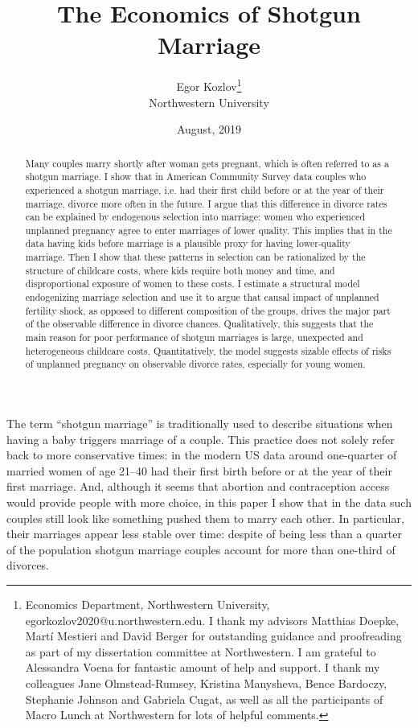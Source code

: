 \documentclass[12pt,letter]{article}
\title{The Economics of Shotgun Marriage}
\author{Egor Kozlov\thanks{Economics Department, Northwestern University, egorkozlov2020@u.northwestern.edu. I thank my advisors Matthias Doepke, Martí Mestieri and David Berger for outstanding guidance and proofreading as part of my dissertation committee at Northwestern. I am grateful to Alessandra Voena for fantastic amount of help and support. I thank my colleagues Jane Olmstead-Rumsey, Kristina Manysheva, Bence Bardoczy, Stephanie Johnson and Gabriela Cugat, as well as all the participants of Macro Lunch at Northwestern for lots of helpful comments.}\\
{\small Northwestern University}}
\date{August, 2019}
\begin{document}
\maketitle

\begin{abstract}
Many couples marry shortly after woman gets pregnant, which is often referred to as a shotgun marriage. I show that in American Community Survey data couples who experienced a shotgun marriage, i.e. had their first child before or at the year of their marriage, divorce more often in the future.
I argue that this difference in divorce rates can be explained by endogenous selection into marriage: women who experienced unplanned pregnancy agree to enter marriages of lower quality. 
This implies that in the data having kids before marriage is a plausible proxy for having lower-quality marriage.
Then I show that these patterns in selection can be rationalized by the structure of childcare costs, where kids require both money and time, and disproportional exposure of women to these costs.
I estimate a structural model endogenizing marriage selection and use it to argue that causal impact of unplanned fertility shock,
as opposed to different composition of the groups, drives the major part of the observable difference in divorce chances.
Qualitatively, this suggests that the main reason for poor performance of shotgun marriages is large, unexpected and heterogeneous childcare costs. Quantitatively, the model suggests sizable effects of risks of unplanned pregnancy on observable divorce rates, especially for young women.
\end{abstract}

\newpage

The term ``shotgun marriage'' is traditionally used to describe situations when having a baby triggers marriage of a couple. This practice does not solely refer back to more conservative times: in the modern US data around one-quarter of married women of age 21--40 had their first birth before or at the year of their first marriage. And, although it seems that abortion and contraception access would provide people with more choice, in this paper I show that in the data such couples still look like something pushed them to marry each other. In particular, their marriages appear less stable over time: despite of being less than a quarter of the population shotgun marriage couples account for more than one-third of divorces.
\end{document}
